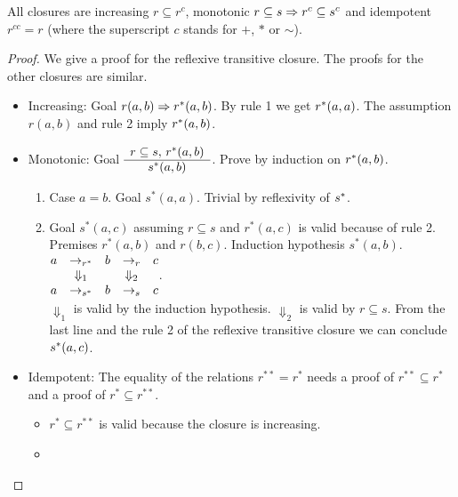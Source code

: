 \begin{theorem}
  All closures are increasing $r \subseteq r^c$, monotonic
  $r \subseteq s \Rightarrow r^c \subseteq s^c$ and idempotent $r^{cc} = r$ (where
  the superscript $c$ stands for $+$, $*$ or $\sim$).
  \begin{proof}  We give a proof for the reflexive transitive closure. The
    proofs for the other closures are similar.
    \begin{itemize}
    \item
      Increasing: Goal $r(a,b) \Rightarrow r^*(a,b)$. By rule 1 we get
      $r^*(a,a)$. The assumption $r(a,b)$ and rule 2 imply
      $r^*(a,b)$.
    \item
      Monotonic: Goal $\begin{array}{c} r \subseteq s, \, r^*(a,b) \\ \hline s^*(a,b)\end{array}$. Prove by induction on $r^*(a,b)$.
        \begin{enumerate}
        \item Case $a=b$. Goal $s^*(a,a)$. Trivial by reflexivity of $s^*$.
        \item
          Goal $s^*(a,c)$ assuming $r\subseteq s$ and $r^*(a,c)$ is valid
          because of rule 2. Premises $r^*(a,b)$ and $r(b,c)$. Induction
          hypothesis $s^*(a,b)$.
          \\
          $
          \begin{matrix}
            a  & \to_{r^*} & b   &  \to_r   & c \\
                &    \Downarrow_1 & &  \Downarrow_2\\
            a  & \to_{s^*} & b   &  \to_s  &  c
          \end{matrix}$.\\
          $\Downarrow_1$ is valid by the induction
          hypothesis. $\Downarrow_2$ is valid by $r \subseteq s$. From the
          last line and the rule 2 of the reflexive transitive closure we can
          conclude $s^*(a,c)$.
        \end{enumerate}
    \item
      Idempotent: The equality of the relations $r^{**} = r^*$ needs a proof
      of $r^{**} \subseteq r^*$ and a proof of $r^* \subseteq r^{**}$.
      \begin{itemize}
      \item $ r^* \subseteq r^{**}$ is valid because the
        closure is increasing.
      \item

\end{itemize}
\end{itemize}
\end{proof}
\end{theorem}
